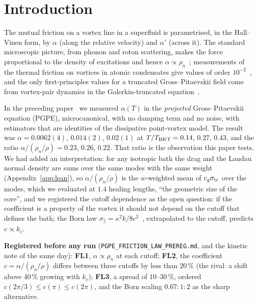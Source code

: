 \documentclass[11pt,a4paper]{article}
\begin{document}
\section{Introduction}

The mutual friction on a vortex line in a superfluid is parametrised, in the Hall--Vinen form, by $\alpha$ (along the
relative velocity) and $\alpha'$ (across it). The standard microscopic picture, from phonon and roton scattering, makes the force proportional
to the density of excitations and hence $\alpha\propto\rho_n$~\cite{Iordanskii1964,Sonin1997}; measurements of the thermal friction on vortices in atomic condensates give values of order $10^{-2}$~\cite{Moon2015,Kwon2021}, and the only first-principles values for a
truncated Gross--Pitaevskii field come from vortex-pair dynamics in the Galerkin-truncated equation~\cite{Shukla2014}.

In the preceding paper~\cite{Callens2026a} we measured $\alpha(T)$ in the \emph{projected} Gross--Pitaevskii equation (PGPE), microcanonical,
with no damping term and no noise, with estimators that are identities of the dissipative point-vortex model. The result was
$\alpha=0.0062(4)$, $0.014(2)$, $0.02(1)$ at $T/T_{\rm BKT}=0.14$, $0.27$, $0.43$, and the ratio $\alpha/(\rho_n/\rho)=0.23$, $0.26$, $0.22$. That ratio is
the observation this paper tests. We had added an interpretation: for any isotropic bath the drag and the Landau normal density are sums over the same modes with the
same weight (Appendix~\ref{app:lean}), so $\alpha/(\rho_n/\rho)$ is the $w$-weighted mean of $c_g\sigma_{\rm tr}$ over the modes, which we evaluated at $1.4$
healing lengths, ``the geometric size of the core'', and we registered the cutoff dependence as the open question: if the coefficient is a property of the vortex
it should not depend on the cutoff that defines the bath; the Born law $\sigma_\parallel=\kappa^2k/8c^2$~\cite{Sonin1997}, extrapolated to the cutoff, predicts $c\propto k_c$.

\begin{keybox}
\textbf{Registered before any run} (\texttt{PGPE\_FRICTION\_LAW\_PREREG.md}, and the kinetic note of the same day): \textbf{FL1}, $\alpha\propto\rho_n$ at each cutoff;
\textbf{FL2}, the coefficient $c=\alpha/(\rho_n/\rho)$ differs between three cutoffs by less than $20\,\%$ (the rival: a shift above $40\,\%$ growing with $k_c$);
\textbf{FL3}, a spread of $10$--$30\,\%$, ordered $c(2\pi/3)\le c(\pi)\le c(2\pi)$, and the Born scaling $0.67:1:2$ as the sharp alternative.
\end{keybox}
\end{document}
